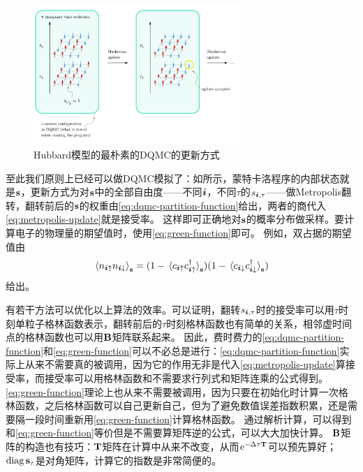 \documentclass[UTF8]{ctexart}
\DeclareMathOperator{\diag}{diag}
\newcommand*{\ee}{\mathrm{e}}
\begin{document}
\begin{figure}
    \centering
    \includegraphics[width = 0.7\textwidth]{../hubbard-report/naive-dqmc.pdf}
    \caption{Hubbard模型的最朴素的DQMC的更新方式}
    \label{fig:naive-dqmc}
\end{figure}

至此我们原则上已经可以做DQMC模拟了：如所示，蒙特卡洛程序的内部状态就是$\vb{s}$，更新方式为对$\vb{s}$中的全部自由度——不同$\vb*{i}$，不同$\tau$的$s_{\vb*{i}, \tau}$——做Metropolis翻转，翻转前后的$\vb{s}$的权重由\eqref{eq:dqmc-partition-function}给出，两者的商代入\eqref{eq:metropolis-update}就是接受率。
这样即可正确地对$\vb{s}$的概率分布做采样。要计算电子的物理量的期望值时，使用\eqref{eq:green-function}即可。
例如，双占据的期望值由
\begin{equation}
    \expval*{n_{\vb*{i} \uparrow} n_{\vb*{i} \downarrow}}_{\vb{s}} = (1 - \expval*{c_{\vb*{i} \uparrow} c^\dagger_{\vb*{i} \uparrow}}_{\vb{s}})  (1 - \expval*{c_{\vb*{i} \downarrow} c^\dagger_{\vb*{i} \downarrow}}_{\vb{s}})
\end{equation}
给出。

有若干方法可以优化以上算法的效率。可以证明，翻转$s_{\vb*{i}, \tau}$时的接受率可以用$\tau$时刻单粒子格林函数表示，翻转前后的$\tau$时刻格林函数也有简单的关系，相邻虚时间点的格林函数也可以用$\vb{B}$矩阵联系起来。
因此，费时费力的\eqref{eq:dqmc-partition-function}和\eqref{eq:green-function}可以不必总是进行：\eqref{eq:dqmc-partition-function}实际上从来不需要真的被调用，因为它的作用无非是代入\eqref{eq:metropolis-update}算接受率，而接受率可以用格林函数和不需要求行列式和矩阵连乘的公式得到。
\eqref{eq:green-function}理论上也从来不需要被调用，因为只要在初始化时计算一次格林函数，之后格林函数可以自己更新自己，但为了避免数值误差指数积累，还是需要隔一段时间重新用\eqref{eq:green-function}计算格林函数。
通过解析计算，可以得到和\eqref{eq:green-function}等价但是不需要算矩阵逆的公式，可以大大加快计算。
$\vb{B}$矩阵的构造也有技巧：$\vb{T}$矩阵在计算中从来不改变，从而$\ee^{- \Delta \tau \vb{T}}$可以预先算好；$\diag \vb{s}_\tau$是对角矩阵，计算它的指数是非常简便的。
\end{document}
